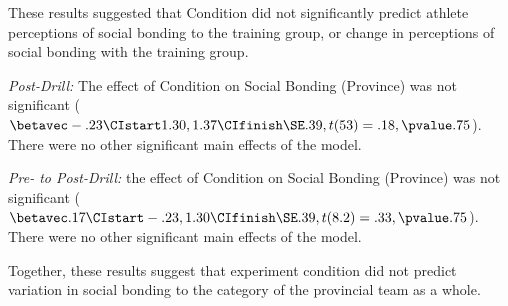 These results suggested that Condition did not significantly predict athlete perceptions of social bonding to the training group, or change in perceptions of social bonding with the training group.



\textit{Post-Drill:}
The effect of Condition on Social Bonding (Province) was not significant ($\betavec -.23 \CIstart 1.30, 1.37 \CIfinish \SE .39, t(53)= .18, \pvalue .75$). There were no other significant main effects of the model.

\textit{Pre- to Post-Drill:} the effect of Condition on Social Bonding (Province) was not significant ($\betavec .17 \CIstart -.23, 1.30 \CIfinish \SE .39, t(8.2)= .33, \pvalue .75$). There were no other significant main effects of the model.

Together, these results suggest that experiment condition did not predict variation in social bonding to the category of the provincial team as a whole.











